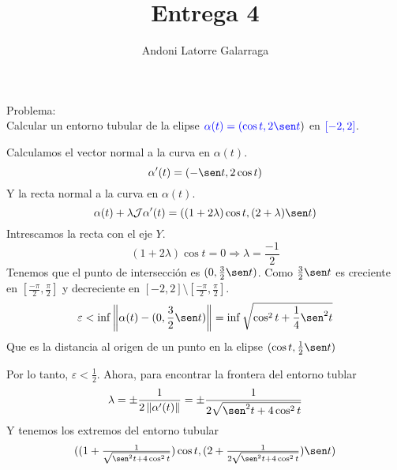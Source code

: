\documentclass{article}
\title{Entrega 4}
\author{Andoni Latorre Galarraga}
\date{}
\begin{document}
\maketitle
\begin{multicols}{2}
\textcolor{WildStrawberry}{Problema:}\\
Calcular un entorno tubular de la elipse $\textcolor{blue}{\alpha(t)=(\cos t, 2 \sen t})$ en $\textcolor{blue}{[-2,2]}$.\\
\begin{center}
\end{center}
Calculamos el vector normal a la curva en $\alpha(t)$.
$$
\alpha'(t) = (-\sen t, 2\cos t)
$$
Y la recta normal a la curva en $\alpha(t)$.
$$
\alpha(t)+\lambda \mathcal{J}\alpha'(t) = ((1+2\lambda)\cos t, (2+\lambda) \sen t)
$$
Intrescamos la recta con el eje $Y$.
$$
(1+2\lambda)\cos t = 0 \Rightarrow  \lambda = \frac{-1}{2}
$$
Tenemos que el punto de intersección es $(0, \frac{3}{2}\sen t)$. Como $\frac{3}{2}\sen t$ es creciente en $[\frac{-\pi}{2}, \frac{\pi}{2}]$ y decreciente en $[-2,2]\setminus [\frac{-\pi}{2}, \frac{\pi}{2}]$.
$$
\varepsilon < \inf \left\| \alpha(t)- (0, \frac{3}{2}\sen t)\right\| = \inf \sqrt{\cos^2 t + \frac{1}{4} \sen^2 t}
$$
Que es la distancia al origen de un punto en la elipse $(\cos t, \frac{1}{2}\sen t)$\\
\begin{center}
\end{center}
Por lo tanto, $\varepsilon < \frac{1}{2}$. Ahora, para encontrar la frontera del entorno tublar
$$
\lambda = \pm \frac{1}{2 \left\| \alpha'(t) \right\|} = \pm \frac{1}{2 \sqrt{\sen^2 t + 4 \cos^2 t}}
$$
Y tenemos los extremos del entorno tubular
$$
\begin{array}{l}
  ((1+\frac{1}{\sqrt{\sen^2 t + 4 \cos^2 t}})\cos t, (2+\frac{1}{2 \sqrt{\sen^2 t + 4 \cos^2 t}}) \sen t) \\

\end{array}$$
\end{multicols}
\end{document}

